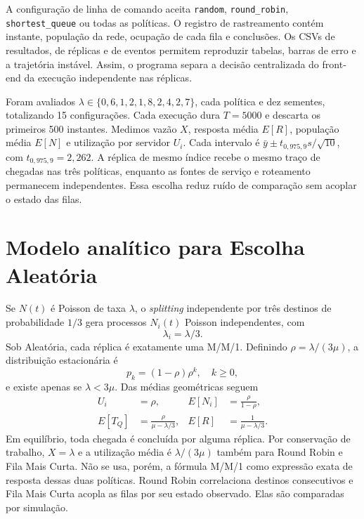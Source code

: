 \documentclass[conference]{IEEEtran}
\begin{document}
A configuração de linha de comando aceita \texttt{random}, \texttt{round\_robin}, \texttt{shortest\_queue} ou todas as políticas. O registro de rastreamento contém instante, população da rede, ocupação de cada fila e conclusões. Os CSVs de resultados, de réplicas e de eventos permitem reproduzir tabelas, barras de erro e a trajetória instável. Assim, o programa separa a decisão centralizada do front-end da execução independente nas réplicas.

Foram avaliados $\lambda\in\{0{,}6,1{,}2,1{,}8,2{,}4,2{,}7\}$, cada política e dez sementes, totalizando 15 configurações. Cada execução dura $T=5000$ e descarta os primeiros 500 instantes. Medimos vazão $X$, resposta média $E[R]$, população média $E[N]$ e utilização por servidor $U_i$. Cada intervalo é $\bar y\pm t_{0{,}975,9}s/\sqrt{10}$, com $t_{0{,}975,9}=2{,}262$. A réplica de mesmo índice recebe o mesmo traço de chegadas nas três políticas, enquanto as fontes de serviço e roteamento permanecem independentes. Essa escolha reduz ruído de comparação sem acoplar o estado das filas.

\section{Modelo analítico para Escolha Aleatória}
Se $N(t)$ é Poisson de taxa $\lambda$, o \textit{splitting} independente por três destinos de probabilidade $1/3$ gera processos $N_i(t)$ Poisson independentes, com
\begin{equation}
\lambda_i=\lambda/3.
\end{equation}
Sob Aleatória, cada réplica é exatamente uma M/M/1. Definindo $\rho=\lambda/(3\mu)$, a distribuição estacionária é
\begin{equation}
p_k=(1-\rho)\rho^k,\quad k\geq0,
\end{equation}
e existe apenas se $\lambda<3\mu$. Das médias geométricas seguem
\begin{align}
U_i&=\rho,&E[N_i]&=\frac{\rho}{1-\rho},\\
E[T_Q]&=\frac{\rho}{\mu-\lambda/3},&E[R]&=\frac{1}{\mu-\lambda/3}.
\end{align}
Em equilíbrio, toda chegada é concluída por alguma réplica. Por conservação de trabalho, $X=\lambda$ e a utilização média é $\lambda/(3\mu)$ também para Round Robin e Fila Mais Curta. Não se usa, porém, a fórmula M/M/1 como expressão exata de resposta dessas duas políticas. Round Robin correlaciona destinos consecutivos e Fila Mais Curta acopla as filas por seu estado observado. Elas são comparadas por simulação.
\end{document}
